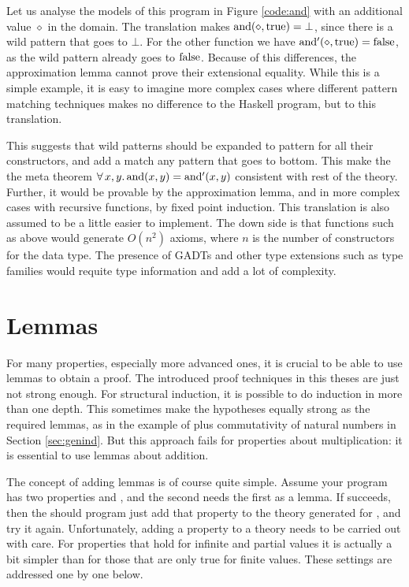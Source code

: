 Let us analyse the models of this program in Figure \ref{code:and}
with an additional value $\diamond$ in the domain. The translation
makes $\mathrm{and}(\diamond,\mathrm{true}) = \bot$, since there is a wild
pattern that goes to $\bot$. For the other function we have
$\mathrm{and'}(\diamond,\mathrm{true}) = \mathrm{false}$, as the wild pattern
already goes to $\mathrm{false}$. Because of this differences, the
approximation lemma cannot prove their extensional equality. While
this is a simple example, it is easy to imagine more complex cases
where different pattern matching techniques makes no difference to the
Haskell program, but to this translation.

This suggests that wild patterns should be expanded to pattern for all
their constructors, and add a match any pattern that goes to
bottom. This make the the meta theorem
$\forall \, x , y . \, \mathrm{and}(x,y) = \mathrm{and'}(x,y)$ consistent with rest of the
theory.  Further, it would be provable by the approximation lemma, and
in more complex cases with recursive functions, by fixed point
induction. This translation is also assumed to be a little easier to
implement. The down side is that functions such as  above
would generate $O(n^2)$ axioms, where $n$ is the number of constructors for
the data type. The presence of GADTs and other type extensions such as
type families would requite type information and add a lot of complexity.

\section{Lemmas}

For many properties, especially more advanced ones, it is crucial to
be able to use lemmas to obtain a proof. The introduced proof
techniques in this theses are just not strong enough. For structural
induction, it is possible to do induction in more than one depth. This
sometimes make the hypotheses equally strong as the required lemmas,
as in the example of plus commutativity of natural numbers in Section
\ref{sec:genind}. But this approach fails for properties about
multiplication: it is essential to use lemmas about addition.

The concept of adding lemmas is of course quite simple. Assume your
program has two properties  and , and the
second needs the first as a lemma. If  succeeds, then the
should program just add that property to the theory generated for
, and try it again. Unfortunately, adding a property to a
theory needs to be carried out with care. For properties that hold for
infinite and partial values it is actually a bit simpler than for
those that are only true for finite values. These settings are
addressed one by one below.

